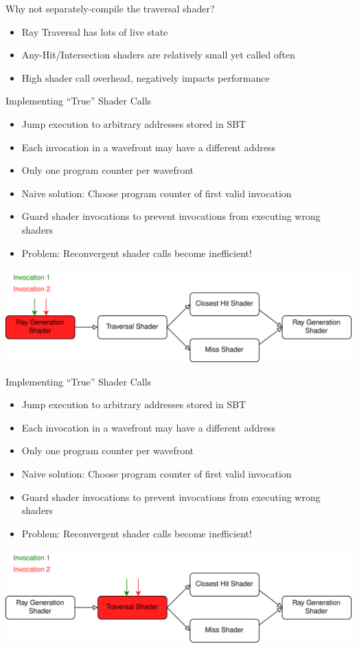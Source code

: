 \documentclass[aspectratio=169,t]{beamer}
\begin{document}
\begin{slide}{Why not separately-compile the traversal shader?}
 \begin{itemize}
  \item Ray Traversal has lots of live state
  \item Any-Hit/Intersection shaders are relatively small yet called often
  \item High shader call overhead, negatively impacts performance
 \end{itemize}
\end{slide}

\begin{slide}{Implementing ``True'' Shader Calls}
 \begin{itemize}
  \item Jump execution to arbitrary addresses stored in SBT
  \item Each invocation in a wavefront may have a different address
  \item Only one program counter per wavefront
  \item Naive solution: Choose program counter of first valid invocation
  \item Guard shader invocations to prevent invocations from executing wrong shaders
  \item Problem: Reconvergent shader calls become inefficient!
 \end{itemize}
 \pause
 \includegraphics[width=\textwidth]{graphics/RTStages2-1.png}
\end{slide}

\begin{slide}{Implementing ``True'' Shader Calls}
 \begin{itemize}
  \item Jump execution to arbitrary addresses stored in SBT
  \item Each invocation in a wavefront may have a different address
  \item Only one program counter per wavefront
  \item Naive solution: Choose program counter of first valid invocation
  \item Guard shader invocations to prevent invocations from executing wrong shaders
  \item Problem: Reconvergent shader calls become inefficient!
 \end{itemize}
 \includegraphics[width=\textwidth]{graphics/RTStages2-2.png}
\end{slide}
\end{document}
